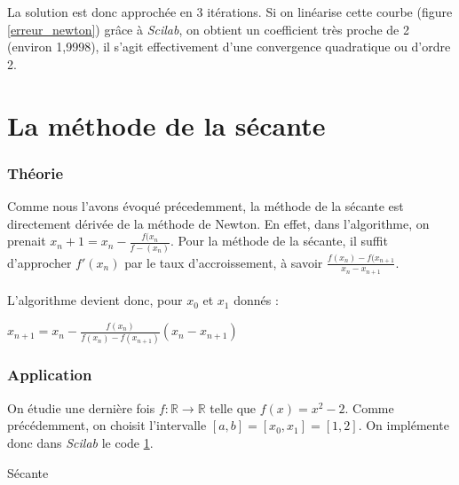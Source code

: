 \documentclass[a4paper,10pt]{report}
\begin{document}
La solution est donc approchée en 3 itérations. Si on linéarise cette courbe (figure \ref{erreur_newton}) grâce à \textit{Scilab}, on obtient un coefficient très proche de 2 (environ 1,9998), il s'agit effectivement d'une convergence quadratique ou d'ordre 2.

\newpage
\section{La méthode de la sécante}
\subsubsection{Théorie}
Comme nous l'avons évoqué précedemment, la méthode de la sécante est directement dérivée de la méthode de Newton.
En effet, dans l'algorithme, on prenait $x_n+1=x_n-\frac{f(x_n}{f-(x_n)}$. Pour la méthode de la sécante, il suffit d'approcher $f'(x_n)$ par le taux d'accroissement, à savoir $\frac{f(x_n)-f(x_{n+1}}{x_n-x_{n+1}}$.\\ \\
L'algorithme devient donc, pour $x_0$ et $x_1$ donnés :
\begin{algorithm}
\begin{algorithmic}
\STATE $x_{n+1} =  x_{n}-\frac{f(x_n)}{f(x_n)-f(x_{n+1})}(x_n-x_{n+1})$
\ENDWHILE
\end{algorithmic}
\end{algorithm}

\subsubsection{Application}
On étudie une dernière fois $f : \mathbb{R} \longrightarrow \mathbb{R}$ telle que $f(x)=x^2-2$. Comme précédemment, on choisit l'intervalle $[a,b]=[x_0,x_1]=[1,2]$. On implémente donc dans \textit{Scilab} le code \ref{code_secante}.

\begin{table}[H]
\caption{Sécante}
\label{code_secante}
\begin{tabular}{l}
\\
\end{tabular}
\end{table}
\end{document}
